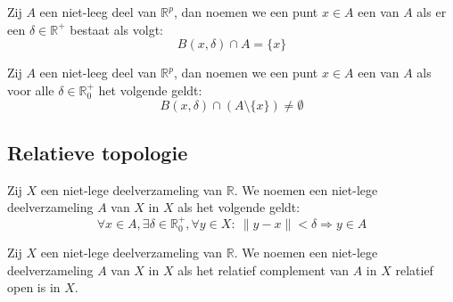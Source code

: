 \documentclass[main.tex]{subfiles}
\begin{document}
\begin{de}
  Zij $A$ een niet-leeg deel van $\mathbb{R}^{p}$, dan noemen we een punt $x\in A$ een  van $A$ als er een $\delta \in \mathbb{R}^{+}$ bestaat als volgt:
  \[ B(x,\delta) \cap A = \{x\} \]
\end{de}

\begin{de}
  Zij $A$ een niet-leeg deel van $\mathbb{R}^{p}$, dan noemen we een punt $x\in A$ een  van $A$ als voor alle $\delta \in \mathbb{R}^{+}_{0}$ het volgende geldt:
  \[ B(x,\delta) \cap (A \setminus \{x\}) \neq \emptyset \]
\end{de}



\subsection{Relatieve topologie}
\label{sec:relatieve-topologie}

\begin{de}
  Zij $X$ een niet-lege deelverzameling van $\mathbb{R}$.
  We noemen een niet-lege deelverzameling $A$ van $X$  in $X$ als het volgende geldt:
  \[ \forall x\in A, \exists \delta \in \mathbb{R}_{0}^{+}, \forall y\in X:\ \|y-x\| < \delta \Rightarrow y \in A \]
\end{de}

\begin{de}
  Zij $X$ een niet-lege deelverzameling van $\mathbb{R}$.
  We noemen een niet-lege deelverzameling $A$ van $X$  in $X$ als het relatief complement van $A$ in $X$ relatief open is in $X$.
\end{de}

\end{document}
